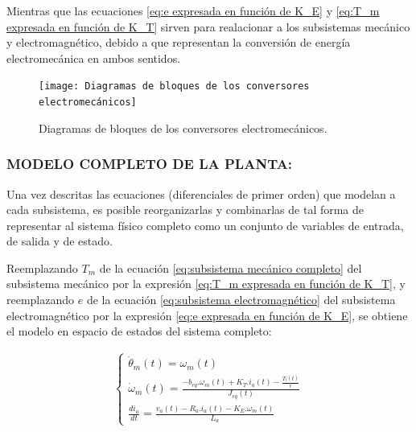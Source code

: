 \documentclass{article}
\begin{document}
\begin{sloppypar}
Mientras que las ecuaciones \ref{eq:e expresada en función de K_E} y \ref{eq:T_m expresada en función de K_T} sirven para realacionar a los subsistemas mecánico y electromagnético, debido a que representan la conversión de energía electromecánica en ambos sentidos.


\begin{figure}[H]
    \centering
    \texttt{[image: Diagramas de bloques de los conversores electromecánicos]}
    \caption{Diagramas de bloques de los conversores electromecánicos.}
    \label{fig:Diagramas de bloques de los conversores electromecánicos}
\end{figure}


\subsubsection{MODELO COMPLETO DE LA PLANTA:}
\label{sec:MODELO COMPLETO DE LA PLANTA:}

Una vez descritas las ecuaciones (diferenciales de primer orden) que modelan a cada subsistema, es posible reorganizarlas y combinarlas de tal forma de representar al sistema físico completo como un conjunto de variables de entrada, de salida y de estado.

Reemplazando $T_m$ de la ecuación \ref{eq:subsistema mecánico completo} del subsistema mecánico por la expresión \ref{eq:T_m expresada en función de K_T}, y reemplazando $e$ de la ecuación \ref{eq:subsistema electromagnético} del subsistema electromagnético por la expresión \ref{eq:e expresada en función de K_E}, se obtiene el modelo en espacio de estados del sistema completo:

\begin{align} \label{eq:modelo completo de la planta}
    \begin{cases}
        \dot{\theta}_m\left(t\right)=\omega_m\left(t\right)
        \\
        \dot{\omega}_m\left(t\right)=\frac{ -b_{eq}.\omega_m(t)+K_T.i_a(t)-\frac{T_l\left(t\right)}{r} }{ J_{eq}(t) }
        \\
        \frac{di_a}{dt}=\frac{v_a(t)-R_a.i_a(t)-K_E.\omega_m(t)}{L_a}
    \end{cases}
\end{align}


\end{sloppypar}
\end{document}
